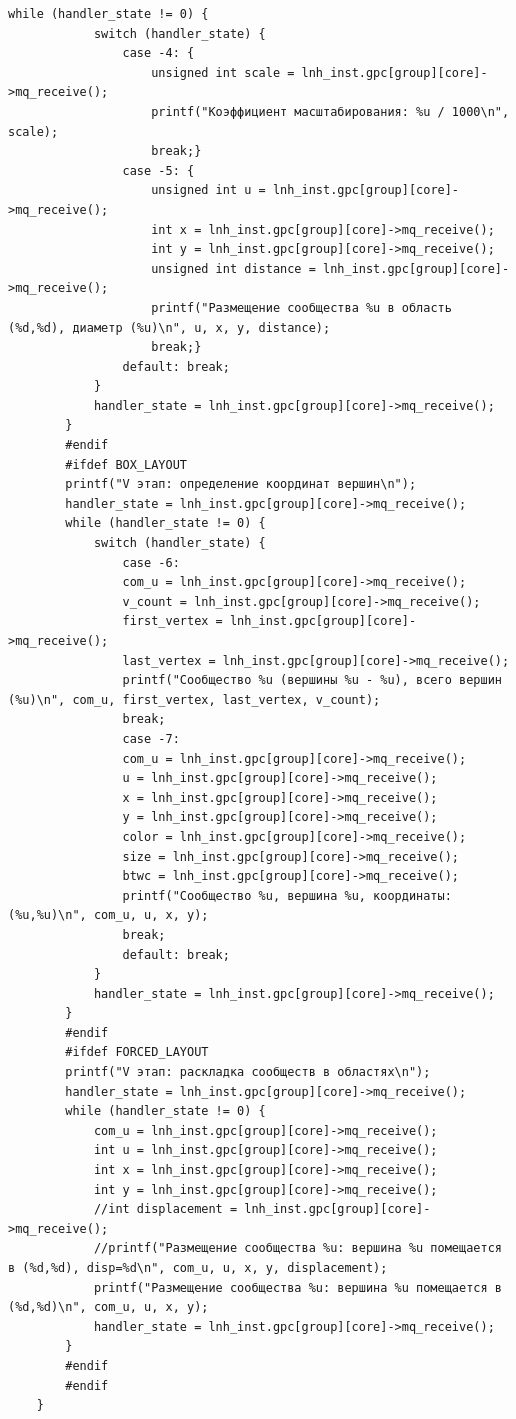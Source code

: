 \begin{lstlisting}[label=lst:host,caption=Измененный код хост-системы под индивидульное задание]
		while (handler_state != 0) {
			switch (handler_state) {
				case -4: {
					unsigned int scale = lnh_inst.gpc[group][core]->mq_receive();
					printf("Коэффициент масштабирования: %u / 1000\n", scale);
					break;}
				case -5: {
					unsigned int u = lnh_inst.gpc[group][core]->mq_receive();
					int x = lnh_inst.gpc[group][core]->mq_receive();
					int y = lnh_inst.gpc[group][core]->mq_receive();
					unsigned int distance = lnh_inst.gpc[group][core]->mq_receive();
					printf("Размещение сообщества %u в область (%d,%d), диаметр (%u)\n", u, x, y, distance);
					break;}
				default: break;
			}
			handler_state = lnh_inst.gpc[group][core]->mq_receive();
		}
		#endif
		#ifdef BOX_LAYOUT
		printf("V этап: определение координат вершин\n");
		handler_state = lnh_inst.gpc[group][core]->mq_receive();
		while (handler_state != 0) {
			switch (handler_state) {
				case -6:
				com_u = lnh_inst.gpc[group][core]->mq_receive();
				v_count = lnh_inst.gpc[group][core]->mq_receive();
				first_vertex = lnh_inst.gpc[group][core]->mq_receive();
				last_vertex = lnh_inst.gpc[group][core]->mq_receive();
				printf("Сообщество %u (вершины %u - %u), всего вершин (%u)\n", com_u, first_vertex, last_vertex, v_count);
				break;
				case -7:
				com_u = lnh_inst.gpc[group][core]->mq_receive();
				u = lnh_inst.gpc[group][core]->mq_receive();
				x = lnh_inst.gpc[group][core]->mq_receive();
				y = lnh_inst.gpc[group][core]->mq_receive();
				color = lnh_inst.gpc[group][core]->mq_receive();
				size = lnh_inst.gpc[group][core]->mq_receive();
				btwc = lnh_inst.gpc[group][core]->mq_receive();
				printf("Сообщество %u, вершина %u, координаты: (%u,%u)\n", com_u, u, x, y);
				break;
				default: break;
			}
			handler_state = lnh_inst.gpc[group][core]->mq_receive();
		}
		#endif
		#ifdef FORCED_LAYOUT
		printf("V этап: раскладка сообществ в областях\n");
		handler_state = lnh_inst.gpc[group][core]->mq_receive();
		while (handler_state != 0) {
			com_u = lnh_inst.gpc[group][core]->mq_receive();
			int u = lnh_inst.gpc[group][core]->mq_receive();
			int x = lnh_inst.gpc[group][core]->mq_receive();
			int y = lnh_inst.gpc[group][core]->mq_receive();
			//int displacement = lnh_inst.gpc[group][core]->mq_receive();
			//printf("Размещение сообщества %u: вершина %u помещается в (%d,%d), disp=%d\n", com_u, u, x, y, displacement);
			printf("Размещение сообщества %u: вершина %u помещается в (%d,%d)\n", com_u, u, x, y);
			handler_state = lnh_inst.gpc[group][core]->mq_receive();
		}
		#endif
		#endif
	}
	

\end{lstlisting}
